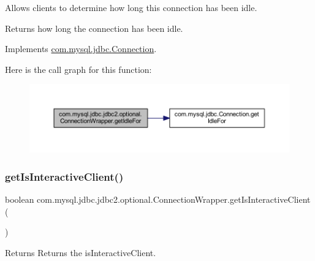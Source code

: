 Allows clients to determine how long this connection has been idle.

\begin{DoxyReturn}{Returns}
how long the connection has been idle. 
\end{DoxyReturn}


Implements \mbox{\hyperlink{interfacecom_1_1mysql_1_1jdbc_1_1_connection_ae3e5825f1ce28db5688c14a0ddbd95f9}{com.\+mysql.\+jdbc.\+Connection}}.

Here is the call graph for this function\+:
\nopagebreak
\begin{figure}[H]
\begin{center}
\leavevmode
\includegraphics[width=350pt]{classcom_1_1mysql_1_1jdbc_1_1jdbc2_1_1optional_1_1_connection_wrapper_a5fe7514c30944bba398ec0412e78bd90_cgraph}
\end{center}
\end{figure}
\mbox{\label{classcom_1_1mysql_1_1jdbc_1_1jdbc2_1_1optional_1_1_connection_wrapper_ae1fd8eb0bb01d247ca9db06d0fb3377f}} 
\subsubsection{\texorpdfstring{get\+Is\+Interactive\+Client()}{getIsInteractiveClient()}}
{\footnotesize\ttfamily boolean com.\+mysql.\+jdbc.\+jdbc2.\+optional.\+Connection\+Wrapper.\+get\+Is\+Interactive\+Client (\begin{DoxyParamCaption}{ }\end{DoxyParamCaption})}

\begin{DoxyReturn}{Returns}
Returns the is\+Interactive\+Client. 
\end{DoxyReturn}


